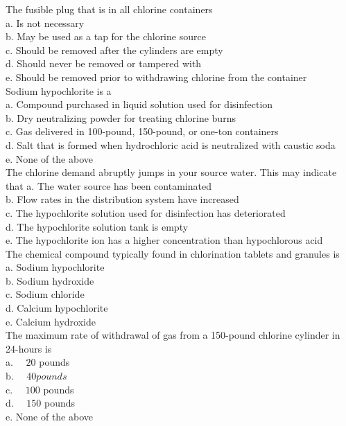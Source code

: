 The fusible plug that is in all chlorine containers\\
a. Is not necessary\\
b. May be used as a tap for the chlorine source\\
c. Should be removed after the cylinders are empty\\
d. Should never be removed or tampered with\\
e. Should be removed prior to withdrawing chlorine from the container\\

Sodium hypochlorite is a\\
a. Compound purchased in liquid solution used for disinfection\\
b. Dry neutralizing powder for treating chlorine burns\\
c. Gas delivered in 100-pound, 150-pound, or one-ton containers\\
d. Salt that is formed when hydrochloric acid is neutralized with caustic soda\\
e. None of the above\\

The chlorine demand abruptly jumps in your source water. This may indicate that a. The water source has been contaminated\\
b. Flow rates in the distribution system have increased\\
c. The hypochlorite solution used for disinfection has deteriorated\\
d. The hypochlorite solution tank is empty\\
e. The hypochlorite ion has a higher concentration than hypochlorous acid\\

The chemical compound typically found in chlorination tablets and granules is\\
a. Sodium hypochlorite\\
b. Sodium hydroxide\\
c. Sodium chloride\\
d. Calcium hypochlorite\\
e. Calcium hydroxide \\

The maximum rate of withdrawal of gas from a 150-pound chlorine cylinder in 24-hours is\\
a. $\quad 20$ pounds\\
b. $\quad 40 pounds$\\
c. $\quad 100$ pounds\\
d. $\quad 150$ pounds\\
e. None of the above\\

